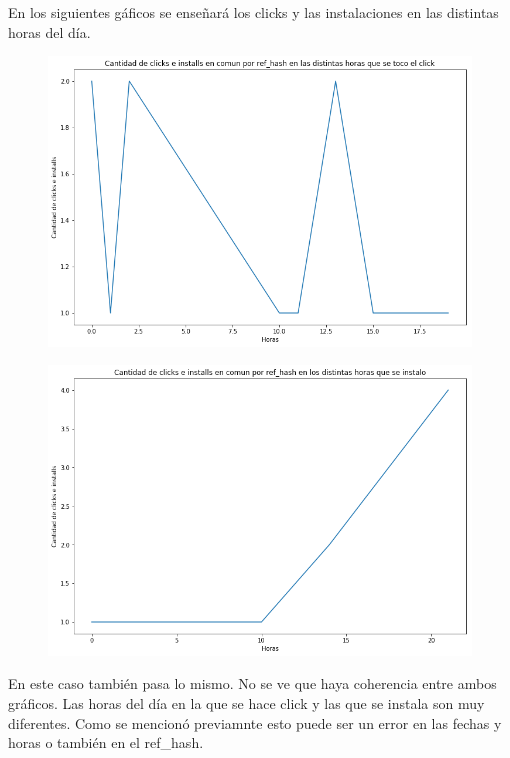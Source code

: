 \documentclass[a4paper, 12pt]{article}
\newcommand\tab[1][1cm]{\hspace*{#1}}
\begin{document}
{{	\tab En los siguientes gáficos se enseñará los clicks y las instalaciones en las distintas horas del día.
	
	\FloatBarrier
		\begin{figure}[h]
			\centering
			\includegraphics[width=\textwidth]{images/clicks-installs/hours_clicks.png}
			\caption{}
		\end{figure}
	\FloatBarrier
	
	\FloatBarrier
		\begin{figure}[h]
			\centering
			\includegraphics[width=\textwidth]{images/clicks-installs/hours_installs.png}
			\caption{}
		\end{figure}
	\FloatBarrier


	\tab En este caso también pasa lo mismo. No se ve que haya coherencia entre ambos gráficos. Las horas del día en la que se hace click y las que se instala son muy diferentes. Como se mencionó previamnte esto puede ser un error en las fechas y horas o también en el ref\_hash.
	

}}
\end{document}
